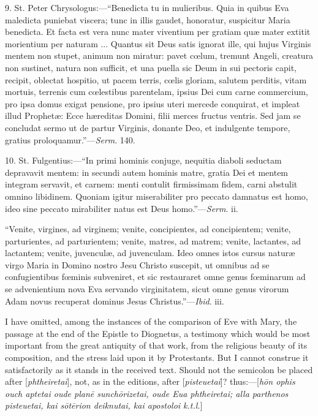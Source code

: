 9. St. Peter Chrysologus:—``Benedicta tu in mulieribus. Quia in
quibus Eva maledicta puniebat viscera; tunc in illis gaudet, honoratur,
suspicitur Maria benedicta. Et facta est vera nunc mater viventium
per gratiam quæ mater extitit morientium per naturam ... Quantus sit
Deus satis ignorat ille, qui hujus Virginis mentem non stupet, animum
non miratur: pavet cœlum, tremunt Angeli, creatura non sustinet, natura
non sufficit, et una puella sic Deum in sui pectoris capit, recipit,
oblectat hospitio, ut pacem terris, cœlis gloriam, salutem perditis,
vitam mortuis, terrenis cum cœlestibus parentelam, ipsius Dei cum carne
commercium, pro ipsa domus exigat pensione, pro ipsius uteri mercede
conquirat, et impleat illud Prophetæ: Ecce hæreditas Domini, filii
merces fructus ventris. Sed jam se concludat sermo ut de partur Virginis,
donante Deo, et indulgente tempore, gratius proloquamur.''—\emph{Serm}.
140.


10. St. Fulgentius:—``In primi hominis conjuge, nequitia
diaboli seductam depravavit mentem: in secundi autem hominis matre,
gratia Dei et mentem integram servavit, et carnem: menti contulit
firmissimam fidem, carni abstulit omnino libidinem. Quoniam igitur
miserabiliter pro peccato damnatus est homo, ideo sine peccato
mirabiliter natus est Deus homo.''—\emph{Serm}. ii.


``Venite, virgines, ad virginem; venite, concipientes, ad
concipientem; venite, parturientes, ad parturientem; venite, matres, ad
matrem; venite, lactantes, ad lactantem; venite, juvenculæ, ad
juvenculam. Ideo omnes istos cursus naturæ virgo Maria in Domino nostro
Jesu Christo suscepit, ut omnibus ad se confugientibus fœminis
subveniret, et sic restauraret omne genus fœminarum ad se advenientium
nova Eva servando virginitatem, sicut omne genus virorum Adam novus
recuperat dominus Jesus Christus.''—\emph{Ibid}. iii.

I have omitted, among the instances of the comparison of Eve with
Mary, the passage at the end of the Epistle to Diognetus, a testimony
which would be most important from the great antiquity of that work,
from the religious beauty of its composition, and the stress laid upon it
by Protestants. But I cannot construe it satisfactorily as it stands in
the received text. Should not the semicolon be placed after [\emph{phtheiretai}],
not, as in the editions, after [\emph{pisteuetai}]? thus:—[\emph{h\={o}n
ophis ouch aptetai oude plan\={e} sunch\={o}rizetai, oude Eua
phtheiretai; alla parthenos pisteuetai, kai s\={o}t\={e}rion
deiknutai, kai apostoloi k.t.l.}]

